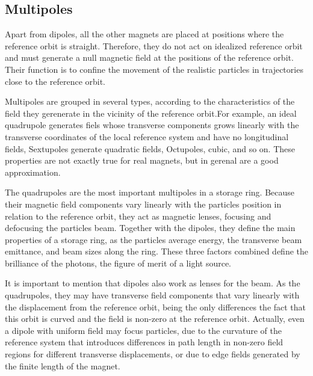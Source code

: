 \documentclass[
	12pt,				%
	openright,			%
	oneside,			%
	a4paper,		%
	chapter=TITLE,		%
	section=TITLE,		%
    brazil,				%
	english,			%
	sumario=tradicional,
	]{abntex2}
\begin{document}
    \subsection{Multipoles}

    Apart from dipoles, all the other magnets are placed at positions where the reference orbit is straight. Therefore, they do not act on idealized reference orbit and must generate a null magnetic field at the positions of the reference orbit. Their function is to confine the movement of the realistic particles in trajectories close to the reference orbit.

    Multipoles are grouped in several types, according to the characteristics of the field they gerenerate in the vicinity of the reference orbit.For example, an ideal quadrupole generates fiels whose transverse components grows linearly with the transverse coordinates of the local reference system and have no longitudinal fields, Sextupoles generate quadratic fields, Octupoles, cubic, and so on. These properties are not exactly true for real magnets, but in gerenal are a good approximation.

    The quadrupoles are the most important multipoles in a storage ring. Because their magnetic field components vary linearly with the particles position in relation to the reference orbit, they act as magnetic lenses, focusing and defocusing the particles beam. Together with the dipoles, they define the main properties of a storage ring, as the particles average energy, the transverse beam emittance, and beam sizes along the ring. These three factors combined define the brilliance of the photons, the figure of merit of a light source.

    It is important to mention that dipoles also work as lenses for the beam. As the quadrupoles, they may have transverse field components that vary linearly with the displacement from the reference orbit, being the only differences the fact that this orbit is curved and the field is non-zero at the reference orbit. Actually, even a dipole with uniform field may focus particles, due to the curvature of the reference system that introduces differences in path length in non-zero field regions for different transverse displacements, or due to edge fields generated by the finite length of the magnet.
\end{document}
